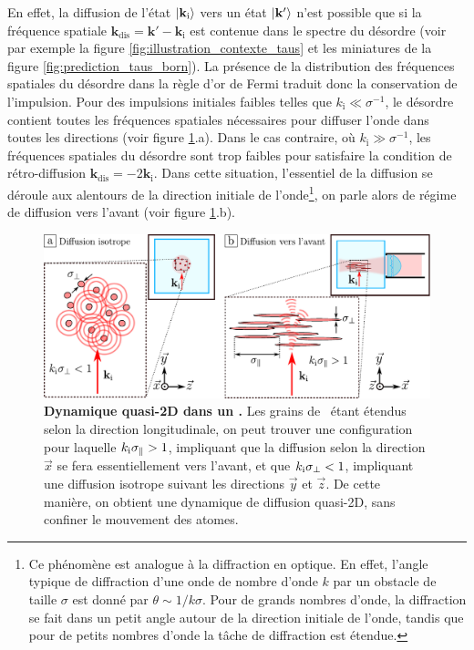 En effet, la diffusion de l'état $\left| \mathbf{k}_{\mathrm{i}} \right\rangle$ vers un état $\left| \mathbf{k}' \right\rangle$ n'est possible que si la fréquence spatiale $\mathbf{k}_{\mathrm{dis}}=\mathbf{k}'-\mathbf{k}_{\mathrm{i}}$ est contenue dans le spectre du désordre (voir par exemple la figure \ref{fig:illustration_contexte_taus} et les miniatures de la figure \ref{fig:prediction_taus_born}). La présence de la distribution des fréquences spatiales du désordre dans la règle d'or de Fermi traduit donc la conservation de l'impulsion. Pour des impulsions initiales faibles telles que $k_{\mathrm{i}}\ll\sigma^{-1}$, le désordre contient toutes les fréquences spatiales nécessaires pour diffuser l'onde dans toutes les directions (voir figure \ref{fig:desordre_2D}.a). Dans le cas contraire, où $k_{\mathrm{i}}\gg\sigma^{-1}$, les fréquences spatiales du désordre sont trop faibles pour satisfaire la condition de rétro-diffusion $\mathbf{k}_{\mathrm{dis}}=-2 \mathbf{k}_{\mathrm{i}}$. Dans cette situation, l'essentiel de la diffusion se déroule aux alentours de la direction initiale de l'onde\footnote{Ce phénomène est analogue à la diffraction en optique. En effet, l'angle typique de diffraction d'une onde de nombre d'onde $k$ par un obstacle de taille $\sigma$ est donné par $\theta\sim 1/k\sigma$. Pour de grands nombres d'onde, la diffraction se fait dans un petit angle autour de la direction initiale de l'onde, tandis que pour de petits nombres d'onde la tâche de diffraction est étendue.}, on parle alors de régime de diffusion vers l'avant (voir figure \ref{fig:desordre_2D}.b). 

\begin{figure}
\centering
\includegraphics[width=\textwidth]{Fig/TauS_PRL/desordre_2D.pdf}
\caption{\textbf{Dynamique quasi-2D dans un \speckle .} Les grains de \speckle\ étant étendus selon la direction longitudinale, on peut trouver une configuration pour laquelle $k_{\mathrm{i}}\sigma_{\parallel}>1$, impliquant que la diffusion selon la direction $\vec{x}$ se fera essentiellement vers l'avant, et que $k_{\mathrm{i}}\sigma_{\perp}<1$, impliquant une diffusion isotrope suivant les directions $\vec{y}$ et $\vec{z}$. De cette manière, on obtient une dynamique de diffusion quasi-2D, sans confiner le mouvement des atomes.}
\label{fig:desordre_2D}
\end{figure}


